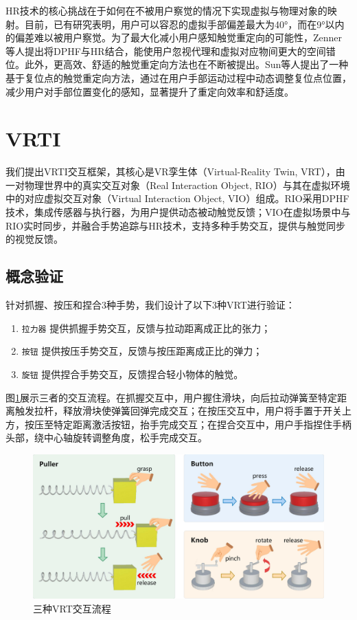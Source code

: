 \documentclass[runningheads]{llncs}
\begin{document}
HR技术的核心挑战在于如何在不被用户察觉的情况下实现虚拟与物理对象的映射。目前，已有研究表明，用户可以容忍的虚拟手部偏差最大为40°\cite{10.1145/3025453.3025753}，而在9°以内的偏差难以被用户察觉\cite{zenner2019estimating}。为了最大化减小用户感知触觉重定向的可能性，Zenner等人提出将DPHF与HR结合，能使用户忽视代理和虚拟对应物间更大的空间错位。此外，更高效、舒适的触觉重定向方法也在不断被提出。Sun等人提出了一种基于复位点的触觉重定向方法，通过在用户手部运动过程中动态调整复位点位置，减少用户对手部位置变化的感知，显著提升了重定向效率和舒适度\cite{10816517}。

\section{VRTI}
我们提出VRTI交互框架，其核心是VR孪生体（Virtual-Reality Twin, VRT），由一对物理世界中的真实交互对象（Real Interaction Object, RIO）与其在虚拟环境中的对应虚拟交互对象（Virtual Interaction Object, VIO）组成。RIO采用DPHF技术，集成传感器与执行器，为用户提供动态被动触觉反馈；VIO在虚拟场景中与RIO实时同步，并融合手势追踪与HR技术，支持多种手势交互，提供与触觉同步的视觉反馈。

\subsection{概念验证}
针对抓握、按压和捏合3种手势，我们设计了以下3种VRT进行验证：

\begin{enumerate}[label={\arabic*)}]
  \item \texttt{拉力器} 提供抓握手势交互，反馈与拉动距离成正比的张力；
  \item \texttt{按钮} 提供按压手势交互，反馈与按压距离成正比的弹力；
  \item \texttt{旋钮} 提供捏合手势交互，反馈捏合轻小物体的触觉。
\end{enumerate}

图\ref{fig:interaction-flow}展示三者的交互流程。在抓握交互中，用户握住滑块，向后拉动弹簧至特定距离触发拉杆，释放滑块使弹簧回弹完成交互；在按压交互中，用户将手置于开关上方，按压至特定距离激活按钮，抬手完成交互；在捏合交互中，用户手指捏住手柄头部，绕中心轴旋转调整角度，松手完成交互。

\begin{figure}[t]
  \centering
  \includegraphics[width=1\textwidth]{image/Interaction-Flow.pdf}
  \caption{三种VRT交互流程}
  \label{fig:interaction-flow}
\end{figure}
\end{document}
